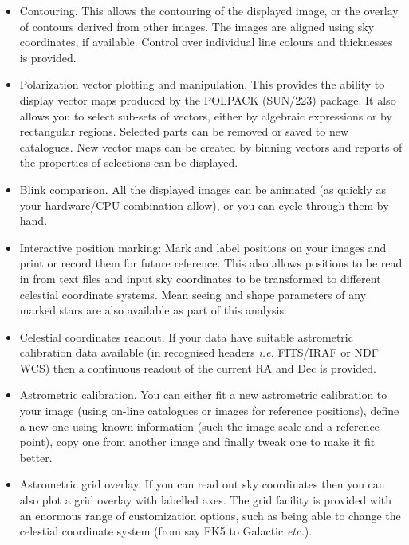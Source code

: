 \documentclass[twoside,11pt]{article}
\newcommand{\xref}[3]{#1}
\renewcommand{\_}{\texttt{\symbol{95}}}
\begin{document}
\begin{itemize}
\item Contouring. This allows the contouring of the displayed image,
 or the overlay of contours derived from other images. The images are
 aligned using sky coordinates, if available. Control over individual
 line colours and thicknesses is provided.

\item Polarization vector plotting and manipulation. This provides the
 ability to display vector maps produced by the POLPACK
 (\xref{SUN/223}{sun223}{}) package. It also allows you to select
 sub-sets of vectors, either by algebraic expressions or by rectangular
 regions. Selected parts can be removed or saved to new catalogues. New
 vector maps can be created by binning vectors and reports of the
 properties of selections can be displayed.

\item Blink comparison. All the displayed images can be animated
  (as quickly as your hardware/CPU combination allow), or
  you can cycle through them by hand.

\item Interactive position marking: Mark and label positions on your
  images and print or record them for future reference. This also
  allows positions to be read in from text files and input sky
  coordinates to be transformed to different celestial coordinate
  systems. Mean seeing and shape parameters of any marked stars are
  also available as part of this analysis.

\item Celestial coordinates readout. If your data have suitable
  astrometric calibration data available (in recognised headers
  \textit{i.e.} FITS/IRAF or NDF WCS) then a continuous readout of the
  current RA and Dec is provided.

\item Astrometric calibration. You can either fit a new
  astrometric calibration to your image (using on-line catalogues or
  images for reference positions), define a new one using known
  information (such the image scale and a reference point), copy one
  from another image and finally tweak one to make it fit better.

\item Astrometric grid overlay. If you can read out sky coordinates
  then you can also plot a grid overlay with labelled
  axes. The grid facility is provided with an enormous range of
  customization options, such as being able to change the
  celestial coordinate system (from say FK5 to  Galactic {\em etc.}).


\end{itemize}
\end{document}
